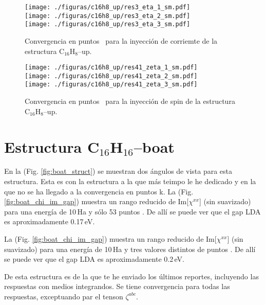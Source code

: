 \documentclass[11pt]{article}
\begin{document}
\begin{figure}[]
	\begin{center}
		\texttt{[image: ./figuras/c16h8\_up/res3\_eta\_1\_sm.pdf]}\\
		\texttt{[image: ./figuras/c16h8\_up/res3\_eta\_2\_sm.pdf]}\\
		\texttt{[image: ./figuras/c16h8\_up/res3\_eta\_3\_sm.pdf]}
	\end{center}
	\caption{Convergencia en puntos \vk \ para la inyecci\'on de corriemte  de la estructura C$_{16}$H$_{8}$--up.}
	\label{fig:up_eta}
\end{figure}

\begin{figure}[]
	\begin{center}
		\texttt{[image: ./figuras/c16h8\_up/res41\_zeta\_1\_sm.pdf]}\\
		\texttt{[image: ./figuras/c16h8\_up/res41\_zeta\_2\_sm.pdf]}\\
		\texttt{[image: ./figuras/c16h8\_up/res41\_zeta\_3\_sm.pdf]}
	\end{center}
	\caption{Convergencia en puntos \vk \ para la inyecci\'on de spin  de la estructura C$_{16}$H$_{8}$--up.}
	\label{fig:up_zeta}
\end{figure}

\newpage

\section{Estructura C$_{16}$H$_{16}$--boat}\label{section:boat}

En la (Fig. \ref{fig:boat_struct}) se muestran dos \'angulos de vista para esta estructura. Esta es con la estructura a la que m\'as teimpo le he dedicado y en la que no se ha llegado a la convergencia en puntos k. La (Fig. \ref{fig:boat_chi_im_gap}) muestra un rango reducido de Im[$\chi^{xx}$] (sin suavizado) para una energ\'ia de 10\,Ha y s\'olo 53 puntos \vk. De all\'i se puede ver que el gap LDA es aproximadamente 0.17\,eV. 

La (Fig. \ref{fig:boat_chi_im_gap}) muestra un rango reducido de Im[$\chi^{xx}$] (sin suavizado) para una energ\'ia de 10\,Ha y tres valores distintos de puntos \vk. De all\'i se puede ver que el gap LDA es aproximadamente 0.2\,eV.

De esta estructura es de la que te he enviado los \'ultimos reportes, incluyendo las respuestas con medios integrandos. Se tiene convergencia para todas las respuestas, exceptuando par el tenson $\zeta^{abc}$.
\end{document}
